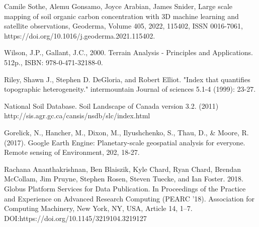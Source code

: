 \documentclass[times,final]{elsarticle.cls}
\begin{document}
\begin{thebibliography}{0}
 Camile Sothe, Alemu Gonsamo, Joyce Arabian, James Snider,
Large scale mapping of soil organic carbon concentration with 3D machine learning and satellite observations, Geoderma, Volume 405, 2022, 115402, ISSN 0016-7061,
https://doi.org/10.1016/j.geoderma.2021.115402.

 Wilson, J.P., Gallant, J.C., 2000. Terrain Analysis - Principles and Applications. 512p., ISBN: 978-0-471-32188-0.

 Riley, Shawn J., Stephen D. DeGloria, and Robert Elliot. "Index that quantifies topographic heterogeneity." intermountain Journal of sciences 5.1-4 (1999): 23-27.

 National Soil Database. Soil Landscape of Canada version 3.2. (2011) \newline
http://sis.agr.gc.ca/cansis/nsdb/slc/index.html

 Gorelick, N., Hancher, M., Dixon, M., Ilyushchenko, S., Thau, D., & Moore, R. (2017). Google Earth Engine: Planetary-scale geospatial analysis for everyone. Remote sensing of Environment, 202, 18-27.

 Rachana Ananthakrishnan, Ben Blaiszik, Kyle Chard, Ryan Chard, Brendan McCollam, Jim Pruyne, Stephen Rosen, Steven Tuecke, and Ian Foster. 2018. Globus Platform Services for Data Publication. In Proceedings of the Practice and Experience on Advanced Research Computing (PEARC '18). Association for Computing Machinery, New York, NY, USA, Article 14, 1–7. DOI:https://doi.org/10.1145/3219104.3219127





\end{thebibliography}
\end{document}
